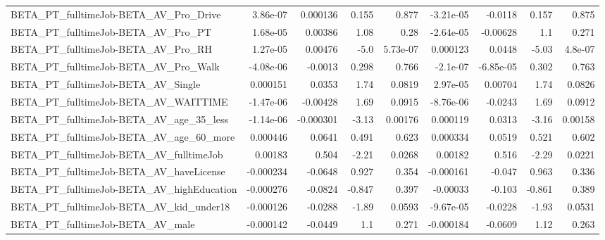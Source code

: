 \begin{tabular}{lrrrrrrrr}
BETA\_PT\_fulltimeJob-BETA\_AV\_Pro\_Drive              &    3.86e-07 &     0.000136 &     0.155 &    0.877 &  -3.21e-05 &     -0.0118 &        0.157 &         0.875 \\
BETA\_PT\_fulltimeJob-BETA\_AV\_Pro\_PT                 &    1.68e-05 &      0.00386 &      1.08 &     0.28 &  -2.64e-05 &    -0.00628 &          1.1 &         0.271 \\
BETA\_PT\_fulltimeJob-BETA\_AV\_Pro\_RH                 &    1.27e-05 &      0.00476 &      -5.0 & 5.73e-07 &   0.000123 &      0.0448 &        -5.03 &       4.8e-07 \\
BETA\_PT\_fulltimeJob-BETA\_AV\_Pro\_Walk               &   -4.08e-06 &      -0.0013 &     0.298 &    0.766 &   -2.1e-07 &   -6.85e-05 &        0.302 &         0.763 \\
BETA\_PT\_fulltimeJob-BETA\_AV\_Single                 &    0.000151 &       0.0353 &      1.74 &   0.0819 &   2.97e-05 &     0.00704 &         1.74 &        0.0826 \\
BETA\_PT\_fulltimeJob-BETA\_AV\_WAITTIME               &   -1.47e-06 &     -0.00428 &      1.69 &   0.0915 &  -8.76e-06 &     -0.0243 &         1.69 &        0.0912 \\
BETA\_PT\_fulltimeJob-BETA\_AV\_age\_35\_less            &   -1.14e-06 &    -0.000301 &     -3.13 &  0.00176 &   0.000119 &      0.0313 &        -3.16 &       0.00158 \\
BETA\_PT\_fulltimeJob-BETA\_AV\_age\_60\_more            &    0.000446 &       0.0641 &     0.491 &    0.623 &   0.000334 &      0.0519 &        0.521 &         0.602 \\
BETA\_PT\_fulltimeJob-BETA\_AV\_fulltimeJob            &     0.00183 &        0.504 &     -2.21 &   0.0268 &    0.00182 &       0.516 &        -2.29 &        0.0221 \\
BETA\_PT\_fulltimeJob-BETA\_AV\_haveLicense            &   -0.000234 &      -0.0648 &     0.927 &    0.354 &  -0.000161 &      -0.047 &        0.963 &         0.336 \\
BETA\_PT\_fulltimeJob-BETA\_AV\_highEducation          &   -0.000276 &      -0.0824 &    -0.847 &    0.397 &   -0.00033 &      -0.103 &       -0.861 &         0.389 \\
BETA\_PT\_fulltimeJob-BETA\_AV\_kid\_under18            &   -0.000126 &      -0.0288 &     -1.89 &   0.0593 &  -9.67e-05 &     -0.0228 &        -1.93 &        0.0531 \\
BETA\_PT\_fulltimeJob-BETA\_AV\_male                   &   -0.000142 &      -0.0449 &       1.1 &    0.271 &  -0.000184 &     -0.0609 &         1.12 &         0.263 \\

\end{tabular}

